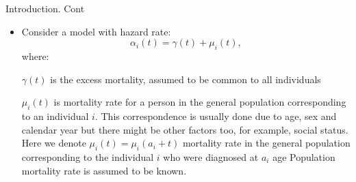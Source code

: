 \documentclass{beamer}
\begin{document}
 \begin{frame}{Introduction. Cont}
 \begin{itemize}
    \item Consider a model with hazard rate:
    \begin{equation}
    \label{eq0}
       \alpha_i(t) = \gamma(t) + \mu_i(t),
    \end{equation} where:


     
     $\gamma(t)$ is the excess mortality, assumed to be common to all individuals%
     
     
     $\mu_i(t)$ is mortality rate for a person in the general population corresponding to an individual $i$. This correspondence is usually done due to age, sex and calendar year but there might be other factors too, for example, social status.
     \newline
     Here we denote $\mu_i(t) = \mu_i(a_i + t)$ mortality rate in the general population corresponding to the individual $i$ who were diagnosed at $a_i$ age
     \newline
     Population mortality rate is assumed to be known. 
 \end{itemize}
 \end{frame}
 

\end{document}
